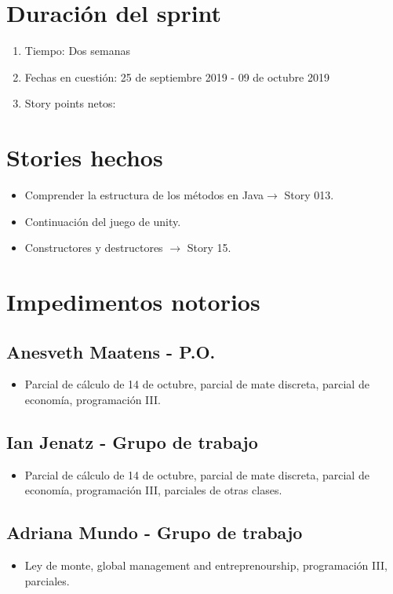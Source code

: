 \section{Duración del sprint}
\begin{enumerate}
    \item Tiempo: Dos semanas
    \item Fechas en cuestión: 25 de septiembre 2019 - 09 de octubre 2019
    \item Story points netos: 
\end{enumerate}
\section{Stories hechos}
\begin{itemize}
    \item Comprender la estructura de los métodos en Java$\rightarrow$ Story 013.
    \item Continuación del juego de unity.
    \item Constructores y destructores $\rightarrow$ Story 15.
\end{itemize}
\section{Impedimentos notorios}
\subsection{Anesveth Maatens - P.O.}
\begin{itemize}
    \item Parcial de cálculo de 14 de octubre, parcial de mate discreta, parcial de economía, programación III.
\end{itemize}
\subsection{Ian Jenatz - Grupo de trabajo}
\begin{itemize}
    \item Parcial de cálculo de 14 de octubre, parcial de mate discreta, parcial de economía, programación III, parciales de otras clases.
\end{itemize}
\subsection{Adriana Mundo - Grupo de trabajo}
\begin{itemize}
    \item Ley de monte, global management and entreprenourship, programación III, parciales.
\end{itemize}



